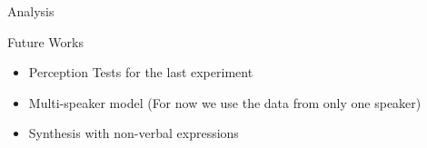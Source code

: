 \documentclass[final]{beamer}
\newlength{\sepwid}
\newlength{\onecolwid}
\begin{document}
\begin{frame}[t]
\begin{columns}[t]
\begin{column}{\onecolwid}
\begin{block}{Analysis}
\end{block}










\begin{alertblock}{Future Works}

\begin{itemize}
    \item Perception Tests for the last experiment
    \item Multi-speaker model (For now we use the data from only one speaker)
    \item Synthesis with non-verbal expressions
\end{itemize}

\end{alertblock} 




\begin{column}{\sepwid}\end{column} %






\end{column}
\end{columns}
\end{frame}
\end{document}
